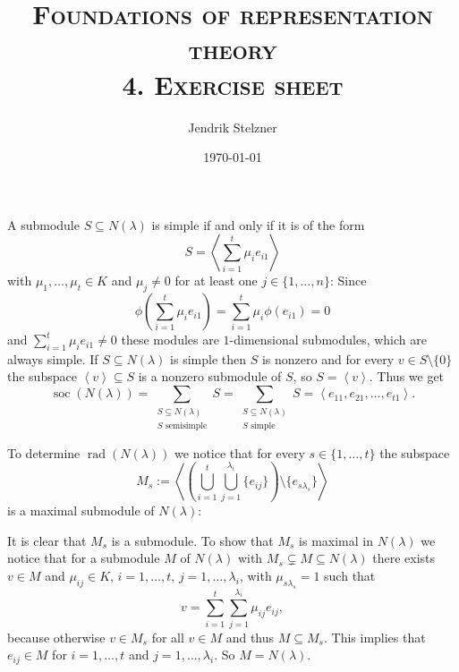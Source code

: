 \documentclass[a4paper,10pt]{article}
\title{\textsc{Foundations of representation theory \\ \Large 4. Exercise sheet}}
\author{Jendrik Stelzner}
\date{\today}
\theoremstyle{definition}
\newcommand{\soc}{\operatorname{soc}}
\newcommand{\rad}{\operatorname{rad}}
\newcommand{\gen}[1]{\left\langle#1\right\rangle}
\begin{document}
\maketitle





\section{}
A submodule $S \subseteq N(\lambda)$ is simple if and only if it is of the form
\[
 S = \gen{\sum_{i=1}^t \mu_i e_{i 1}}
\]
with $\mu_1, \ldots, \mu_t \in K$ and $\mu_j \neq 0$ for at least one $j \in \{1,\ldots,n\}$:
Since
\[
 \phi\left(\sum_{i=1}^t \mu_i e_{i 1}\right) = \sum_{i=1}^t \mu_i \phi(e_{i 1}) = 0
\]
and $\sum_{i=1}^t \mu_i e_{i 1} \neq 0$ these modules are $1$-dimensional submodules, which are always simple. If $S \subseteq N(\lambda)$ is simple then $S$ is nonzero and for every $v \in S\setminus\{0\}$ the subspace $\gen{v} \subseteq S$ is a nonzero submodule of $S$, so $S = \gen{v}$.
Thus we get
\[
 \soc(N(\lambda))
 = \sum_{\substack{S \subseteq N(\lambda) \\ S \text{ semisimple}}} S
 = \sum_{\substack{S \subseteq N(\lambda) \\ S \text{ simple}}} S
 = \gen{e_{1 1}, e_{2 1}, \ldots, e_{t 1}}.
\]

To determine $\rad(N(\lambda))$ we notice that for every $s \in \{1, \ldots, t\}$ the subspace
\[
 M_s := \gen{ \left(\bigcup_{i=1}^t \bigcup_{j=1}^{\lambda_i} \{e_{ij}\}\right) \setminus \{e_{s \lambda_s}\} }
\]
is a maximal submodule of $N(\lambda)$:

It is clear that $M_s$ is a submodule. To show that $M_s$ is maximal in $N(\lambda)$ we notice that for a submodule $M$ of $N(\lambda)$ with $M_s \subsetneq M \subseteq N(\lambda)$ there exists $v \in M$ and $\mu_{ij} \in K$, $i=1,\ldots,t$, $j=1,\ldots,\lambda_i$, with $\mu_{s \lambda_s} = 1$ such that
\[
 v = \sum_{i=1}^t \sum_{j=1}^{\lambda_i} \mu_{ij} e_{ij},
\]
because otherwise $v \in M_s$ for all $v \in M$ and thus $M \subseteq M_s$. This implies that $e_{ij} \in M$ for $i=1,\ldots,t$ and $j=1,\ldots,\lambda_i$. So $M = N(\lambda)$.
\end{document}
